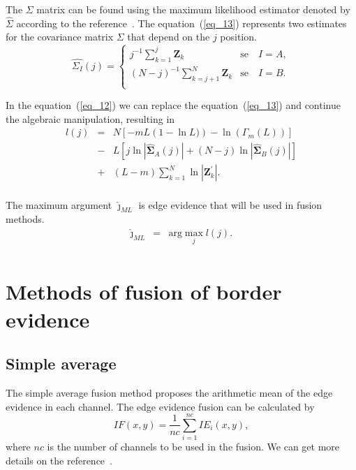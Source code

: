 \documentclass[conference]{IEEEtran}
\begin{document}
The $\Sigma$ matrix can be found using the maximum likelihood estimator denoted by $\widehat{\Sigma}$ according to the reference~\cite{good}. The equation~(\ref{eq_13}) represents two estimates for the covariance matrix $\Sigma$ that depend on the $j$ position.
\begin{equation}\label{eq_13}
\widehat{\Sigma_{I}}(j) = \left\{
\begin{array}{lc}
	j^{-1}\sum_{k=1}^{j}\mathbf{Z}_{k}  & \mbox{se}\quad I=A,  \\
        (N-j)^{-1}\sum_{k=j+1}^{N}\mathbf{Z}_{k} & \mbox{se}\quad I=B. \\
\end{array}
\right.
\end{equation}

In the equation~(\ref{eq_12}) we can replace the equation~(\ref{eq_13}) and continue the algebraic manipulation, resulting in 
\begin{equation}\label{eq_14}
\begin{array}{rcl}
	l(j)&=&N\left[-mL(1-\ln{L)})-\ln{\left(\Gamma_m(L)\right)}\right]\\
	&-&L\left[j\ln{|\mathbf{\widehat{\Sigma}}_{A}(j)|} +(N-j)\ln{|\mathbf{\widehat{\Sigma}}_{B}(j)|}\right]\\
	&+&(L-m)\sum_{k=1}^{N}\ln{|\mathbf{Z}_{k}^{'}|}. \\
\end{array}
\end{equation}

The maximum argument $\widehat{\jmath}_{ML}$ is edge evidence that will be used in fusion methods.
\begin{equation*}
\begin{array}{rcl}
	\widehat{\jmath}_{ML}&=&\text{arg}\max\limits_{j}l(j).  \\
\end{array}
\end{equation*}
\section{Methods of fusion of border evidence}\label{sec_06}
\subsection{Simple average}
The simple average fusion method proposes the arithmetic mean of the edge evidence in each channel. The edge evidence fusion can be calculated by
\begin{equation}
	IF(x,y)=\frac{1}{nc}\sum_{i=1}^{nc}IE_i(x,y),
\end{equation}
where $nc$ is the number of channels to be used in the fusion. We can get more details on the reference~\cite{mit}.
\end{document}
